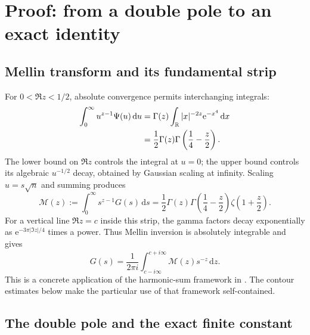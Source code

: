 \documentclass[11pt,a4paper]{article}
\numberwithin{equation}{section}
\theoremstyle{definition}
\newcommand{\R}{\mathbb R}
\newcommand{\dd}{\,\mathrm d}
\newcommand{\e}{\mathrm e}
\begin{document}
\section{Proof: from a double pole to an exact identity}
\label{sec:proof}

\subsection{Mellin transform and its fundamental strip}

For $0<\Re z<1/2$, absolute convergence permits interchanging integrals:
\begin{align}
 \int_0^\infty u^{z-1}\Psi(u)\dd u
 &=\Gamma(z)\int_{\R} |x|^{-2z}\e^{-x^4}\dd x\notag\\
 &=\frac12\Gamma(z)\Gamma\left(\frac14-\frac z2\right).
 \label{eq:mellinpsi}
\end{align}
The lower bound on $\Re z$ controls the integral at $u=0$; the upper
bound controls its algebraic $u^{-1/2}$ decay, obtained by Gaussian
scaling at infinity. Scaling $u=s\sqrt n$
and summing produces
\begin{equation}
 \mathcal M(z):=\int_0^\infty s^{z-1}G(s)\dd s
 =\frac12\Gamma(z)\Gamma\left(\frac14-\frac z2\right)
       \zeta\left(1+\frac z2\right).
 \label{eq:M}
\end{equation}
For a vertical line $\Re z=c$ inside this strip, the gamma factors
decay exponentially as $\e^{-3\pi|\Im z|/4}$ times a power. Thus Mellin
inversion is absolutely integrable and gives
\begin{equation}
 G(s)=\frac1{2\pi i}\int_{c-i\infty}^{c+i\infty}
            \mathcal M(z)s^{-z}\dd z.
 \label{eq:inversion}
\end{equation}
This is a concrete application of the harmonic-sum framework in
\cite{FGD1995}. The contour estimates below make the particular use of
that framework self-contained.

\subsection{The double pole and the exact finite constant}
\end{document}
